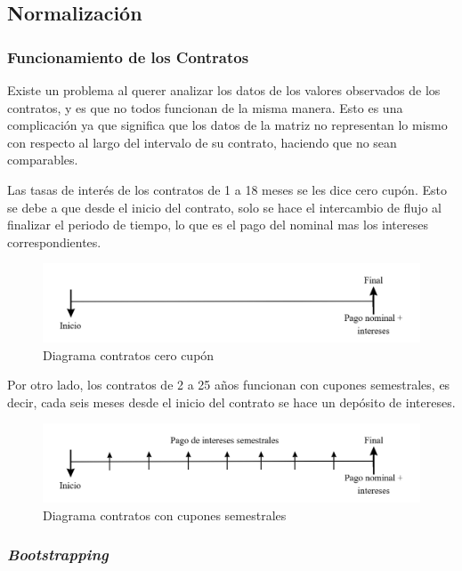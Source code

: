 \subsection{Normalización}

\subsubsection{Funcionamiento de los Contratos}

\qquad Existe un problema al querer analizar los datos de los valores observados de los contratos, y es que no todos funcionan de la misma manera. Esto es una complicación ya que significa que los datos de la matriz no representan lo mismo con respecto al largo del intervalo de su contrato, haciendo que no sean comparables.

\qquad Las tasas de interés de los contratos de 1 a 18 meses se les dice cero cupón. Esto se debe a que desde el inicio del contrato, solo se hace el intercambio de flujo al finalizar el periodo de tiempo, lo que es el pago del nominal mas los intereses correspondientes.
\begin{figure}[H]
  \centering
      \includegraphics[scale=0.45]{images/diagrama_contratos_cero_cupon.png}
  \caption{Diagrama contratos cero cupón
  }\label{fig:0cupon}
\end{figure}

\qquad Por otro lado, los contratos de 2 a 25 años funcionan con cupones semestrales, es decir, cada seis meses desde el inicio del contrato se hace un depósito de intereses.
\begin{figure}[H]
  \centering
    \includegraphics[scale=0.45]{images/diagrama_contratos_semestrales.png}
  \caption{Diagrama contratos con cupones semestrales
  }\label{fig:0cupon}
\end{figure}

\subsubsection{\textit{Bootstrapping}}

